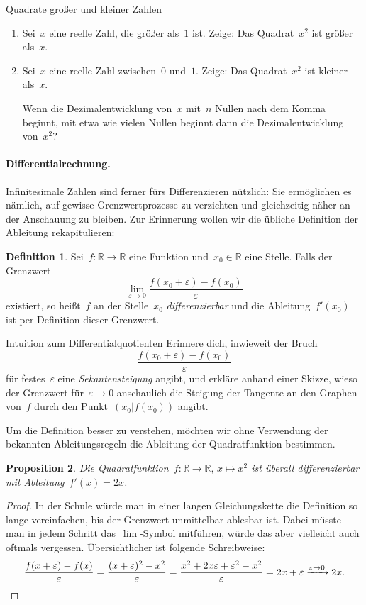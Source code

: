 \documentclass{zirkelblatt}
\newcommand{\RR}{\mathbb{R}}
\newcommand{\xra}[1]{\xrightarrow{#1}}
\theoremstyle{definition}
\newtheorem{defn}{Definition}[section]
\theoremstyle{plain}
\newtheorem{prop}[defn]{Proposition}
\theoremstyle{remark}
\begin{document}
\begin{aufgabeShaded}{Quadrate großer und kleiner Zahlen}
\begin{enumerate}
\item Sei~$x$ eine reelle Zahl, die größer als~$1$ ist. Zeige: Das
Quadrat~$x^2$ ist größer als~$x$.
\item Sei~$x$ eine reelle Zahl zwischen~$0$ und~$1$. Zeige: Das Quadrat~$x^2$
ist kleiner als~$x$.

Wenn die Dezimalentwicklung von~$x$ mit~$n$ Nullen nach dem Komma beginnt, mit
etwa wie vielen Nullen beginnt dann die Dezimalentwicklung von~$x^2$?
\end{enumerate}
\end{aufgabeShaded}

\paragraph{Differentialrechnung.}
Infinitesimale Zahlen sind ferner fürs Differenzieren nützlich: Sie ermöglichen
es nämlich, auf gewisse Grenzwertprozesse zu verzichten und gleichzeitig näher
an der Anschauung zu bleiben. Zur Erinnerung wollen wir die übliche Definition
der Ableitung rekapitulieren:

\begin{defn}Sei~$f : \RR \to \RR$ eine Funktion und~$x_0 \in \RR$ eine Stelle.
Falls der Grenzwert
\[ \lim_{\varepsilon \to 0} \frac{f(x_0 + \varepsilon) - f(x_0)}{\varepsilon} \]
existiert, so heißt~$f$ an der Stelle~$x_0$ \emph{differenzierbar} und die
Ableitung~$f'(x_0)$ ist per Definition dieser Grenzwert.
\end{defn}

\begin{aufgabeShaded}{Intuition zum Differentialquotienten}
Erinnere dich, inwieweit der Bruch
\[ \frac{f(x_0 + \varepsilon) - f(x_0)}{\varepsilon} \]
für festes~$\varepsilon$ eine \emph{Sekantensteigung} angibt, und erkläre anhand einer Skizze, wieso der
Grenzwert für~$\varepsilon \to 0$ anschaulich die Steigung der Tangente an den
Graphen von~$f$ durch den Punkt~$(x_0|f(x_0))$ angibt.
\end{aufgabeShaded}

Um die Definition besser zu verstehen, möchten wir ohne Verwendung der bekannten
Ableitungsregeln die Ableitung der Quadratfunktion bestimmen.

\begin{prop}Die Quadratfunktion~$f : \RR \to \RR,\,x \mapsto x^2$ ist überall
differenzierbar mit Ableitung~$f'(x) = 2x$.\end{prop}
\begin{proof}In der Schule würde man in einer langen Gleichungskette die
Definition so lange vereinfachen, bis der Grenzwert unmittelbar ablesbar ist.
Dabei müsste man in jedem Schritt das~$\lim$-Symbol mitführen, würde das aber
vielleicht auch oftmals vergessen. Übersichtlicher ist folgende Schreibweise:
\[ \frac{f(x + \varepsilon) - f(x)}{\varepsilon} =
  \frac{(x + \varepsilon)^2 - x^2}{\varepsilon} =
  \frac{x^2 + 2x\varepsilon + \varepsilon^2 - x^2}{\varepsilon} =
  2x + \varepsilon \xra{\varepsilon \to 0} 2x. \qedhere \]
\end{proof}
\end{document}
